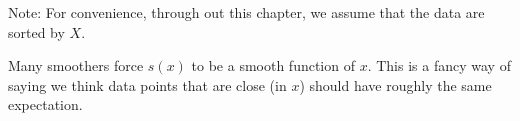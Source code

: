 Note: For convenience, through out this chapter,  we assume that the
data are sorted by $X$. 

Many smoothers force  $s(x)$ to be a smooth function of $x$. This is
a fancy way of saying we think data points that are close (in $x$)
should have roughly the same expectation. 

\newpage



\newpage



\newpage










